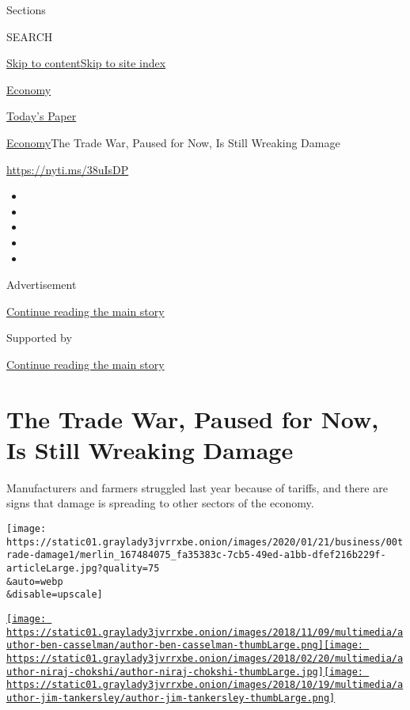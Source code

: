 Sections

SEARCH

\protect\hyperlink{site-content}{Skip to
content}\protect\hyperlink{site-index}{Skip to site index}

\href{https://www.nytimes3xbfgragh.onion/section/business/economy}{Economy}

\href{https://myaccount.nytimes3xbfgragh.onion/auth/login?response_type=cookie\&client_id=vi}{}

\href{https://www.nytimes3xbfgragh.onion/section/todayspaper}{Today's
Paper}

\href{/section/business/economy}{Economy}\textbar{}The Trade War, Paused
for Now, Is Still Wreaking Damage

\url{https://nyti.ms/38uIsDP}

\begin{itemize}
\item
\item
\item
\item
\item
\end{itemize}

Advertisement

\protect\hyperlink{after-top}{Continue reading the main story}

Supported by

\protect\hyperlink{after-sponsor}{Continue reading the main story}

\hypertarget{the-trade-war-paused-for-now-is-still-wreaking-damage}{%
\section{The Trade War, Paused for Now, Is Still Wreaking
Damage}\label{the-trade-war-paused-for-now-is-still-wreaking-damage}}

Manufacturers and farmers struggled last year because of tariffs, and
there are signs that damage is spreading to other sectors of the
economy.

\texttt{[image: https://static01.graylady3jvrrxbe.onion/images/2020/01/21/business/00trade-damage1/merlin\_167484075\_fa35383c-7cb5-49ed-a1bb-dfef216b229f-articleLarge.jpg?quality=75\\\&auto=webp\\\&disable=upscale]}

\href{https://www.nytimes3xbfgragh.onion/by/ben-casselman}{\texttt{[image: https://static01.graylady3jvrrxbe.onion/images/2018/11/09/multimedia/author-ben-casselman/author-ben-casselman-thumbLarge.png]}}\href{https://www.nytimes3xbfgragh.onion/by/niraj-chokshi}{\texttt{[image: https://static01.graylady3jvrrxbe.onion/images/2018/02/20/multimedia/author-niraj-chokshi/author-niraj-chokshi-thumbLarge.jpg]}}\href{https://www.nytimes3xbfgragh.onion/by/jim-tankersley}{\texttt{[image: https://static01.graylady3jvrrxbe.onion/images/2018/10/19/multimedia/author-jim-tankersley/author-jim-tankersley-thumbLarge.png]}}

